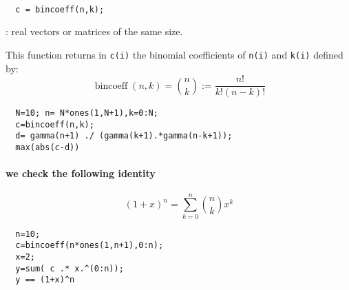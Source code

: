 \begin{mandesc}
  \\
\end{mandesc}
\begin{calling_sequence}
\begin{verbatim}
  c = bincoeff(n,k);
\end{verbatim}
\end{calling_sequence}
\begin{parameters}
  \begin{varlist}
    : real vectors or matrices of the same size.
  \end{varlist}
\end{parameters}

\begin{mandescription}
  This function returns in \verb+c(i)+ the binomial coefficients 
  of \verb+n(i)+ and \verb+k(i)+ defined by: 
\[
   \operatorname{bincoeff}(n,k) = \binom{n}{k} := \frac{n!}{k! (n-k)!}
\]
\end{mandescription}
\begin{examples}

\begin{Verbatim}
  N=10; n= N*ones(1,N+1),k=0:N;
  c=bincoeff(n,k);
  d= gamma(n+1) ./ (gamma(k+1).*gamma(n-k+1));
  max(abs(c-d))
\end{Verbatim}

\paragraph{we check the following identity}
\[
(1+x)^n = \sum_{k=0}^n \binom{n}{k} x^k
\]
\begin{Verbatim}
  n=10;
  c=bincoeff(n*ones(1,n+1),0:n);
  x=2; 
  y=sum( c .* x.^(0:n));
  y == (1+x)^n
\end{Verbatim}

\end{examples}
